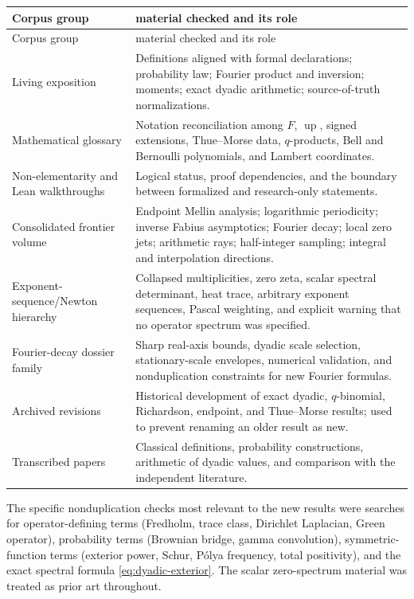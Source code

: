 \documentclass[11pt,oneside]{article}
\theoremstyle{definition}
\newcommand{\Up}{\operatorname{up}}
\begin{document}
\begin{longtable}{>{\raggedright\arraybackslash}p{}
                  >{\raggedright\arraybackslash}p{}}
\toprule
Corpus group&material checked and its role\\
\midrule
\endfirsthead
\toprule
Corpus group&material checked and its role\\
\midrule
\endhead
\bottomrule
\endfoot
Living exposition&Definitions aligned with formal declarations; probability law;
Fourier product and inversion; moments; exact dyadic arithmetic; source-of-truth
normalizations.\\
Mathematical glossary&Notation reconciliation among \(F\), \(\Up\), signed extensions,
Thue--Morse data, \(q\)-products, Bell and Bernoulli polynomials, and Lambert
coordinates.\\
Non-elementarity and Lean walkthroughs&Logical status, proof dependencies, and the
boundary between formalized and research-only statements.\\
Consolidated frontier volume&Endpoint Mellin analysis; logarithmic periodicity;
inverse Fabius asymptotics; Fourier decay; local zero jets; arithmetic rays;
half-integer sampling; integral and interpolation directions.\\
Exponent-sequence/Newton hierarchy&Collapsed multiplicities, zero zeta, scalar
spectral determinant, heat trace, arbitrary exponent sequences, Pascal weighting, and
explicit warning that no operator spectrum was specified.\\
Fourier-decay dossier family&Sharp real-axis bounds, dyadic scale selection,
stationary-scale envelopes, numerical validation, and nonduplication constraints for
new Fourier formulas.\\
Archived revisions&Historical development of exact dyadic, \(q\)-binomial,
Richardson, endpoint, and Thue--Morse results; used to prevent renaming an older result
as new.\\
Transcribed papers&Classical definitions, probability constructions, arithmetic of
dyadic values, and comparison with the independent literature.\\
\end{longtable}

The specific nonduplication checks most relevant to the new results were searches for
operator-defining terms (Fredholm, trace class, Dirichlet Laplacian, Green operator),
probability terms (Brownian bridge, gamma convolution), symmetric-function terms
(exterior power, Schur, P\'olya frequency, total positivity), and the exact spectral
formula \eqref{eq:dyadic-exterior}.  The scalar zero-spectrum material was treated as
prior art throughout.
\end{document}
